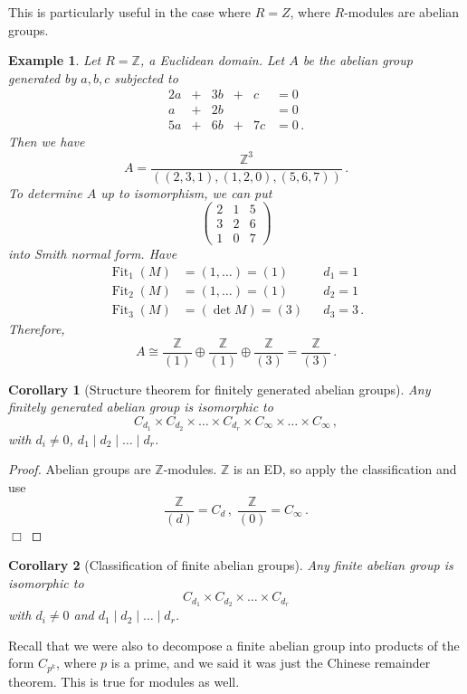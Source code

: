 \documentclass{article}
\theoremstyle{plain}\theoremheaderfont{\normalfont\itshape}\theorembodyfont{\rmfamily}\theoremseparator{.}\newtheorem*{rem}{Remark}\newtheorem*{ex}{Example}\newtheorem*{proof}{Proof}\newtheorem*{altp}{Alternative proof}\newtheorem*{nonex}{Non-Example}
\theoremstyle{plain}\theoremheaderfont{\normalfont\bfseries}\theorembodyfont{\rmfamily}\theoremseparator{.}\newtheorem{thm}{Theorem}[section]\newtheorem{lem}[thm]{Lemma}\newtheorem{prop}[thm]{Proposition}\newtheorem*{cor}{Corollary}\newtheorem{defn}[thm]{Definition}\newtheorem{clm}[thm]{Claim}\newtheorem{clminproof}{Claim}\newtheorem*{notn}{Notation}\newtheorem*{exer}{Exercise}\newtheorem*{lemnn}{Lemma}
\theoremstyle{break}\theoremheaderfont{\normalfont\itshape}\theorembodyfont{\rmfamily}\theoremseparator{.\medskip}\newtheorem*{proofskip}{Proof}\newtheorem*{exs}{Examples}\newtheorem*{rems}{Remarks}\newtheorem*{obs}{Observations}
\theoremstyle{break}\theoremheaderfont{\normalfont\bfseries}\theorembodyfont{\rmfamily}\theoremseparator{.\medskip}\newtheorem{lemskip}[thm]{Lemma}\newtheorem{defnskip}[thm]{Definition}\newtheorem{propskip}[thm]{Proposition}\newtheorem{thmskip}[thm]{Theorem}
\numberwithin{equation}{section}
\newcommand{\qed}{\hfill\ensuremath{\Box}}
\DeclareMathOperator{\Fit}{Fit}
\newcommand{\ZZ}{\mathbb{Z}}
\begin{document}
    This is particularly useful in the case where \(R=Z\), where \(R\)-modules are abelian groups.
    \begin{ex}
        Let \(R=\ZZ\), a Euclidean domain. Let \(A\) be the abelian group generated by \(a,b,c\) subjected to
        \[\begin{alignedat}{4}
            2a & {}+{} & 3b & {}+{} & c &= 0\\
            a & {}+{} & 2b & & &= 0\\
            5a & {}+{} & 6b & {}+{} & 7c &= 0\,.
        \end{alignedat}\]
        Then we have
        \[A=\frac{\ZZ^3}{((2,3,1),(1,2,0),(5,6,7))}\,.\]
        To determine \(A\) up to isomorphism, we can put
        \[\begin{pmatrix}
            2 & 1 & 5\\
            3 & 2 & 6\\
            1 & 0 & 7
        \end{pmatrix}\]
        into Smith normal form. Have
        \begin{align*}
            \Fit_1(M)&=(1,\dots)=(1) && d_1=1\\
            \Fit_2(M)&=(1,\dots)=(1) && d_2=1\\
            \Fit_3(M)&=(\det M)=(3) && d_3=3\,.
        \end{align*}
        Therefore,
        \[A\cong\frac{\ZZ}{(1)}\oplus\frac{\ZZ}{(1)}\oplus\frac{\ZZ}{(3)}=\frac{\ZZ}{(3)}\,.\]
    \end{ex}
    \begin{cor}[Structure theorem for finitely generated abelian groups]
        Any finitely generated abelian group is isomorphic to
        \[C_{d_1}\times C_{d_2}\times \dots\times C_{d_r}\times C_\infty\times\dots\times C_{\infty}\,,\]
        with \(d_i\ne 0\), \(d_1\mid d_2\mid \dots\mid d_r\).
    \end{cor}
    \begin{proof}
        Abelian groups are \(\ZZ\)-modules. \(\ZZ\) is an ED, so apply the classification and use
        \[\frac{\ZZ}{(d)}=C_{d}\,,\;\frac{\ZZ}{(0)}=C_{\infty}\,.\]\qed
    \end{proof}
    \begin{cor}[Classification of finite abelian groups]
        Any finite abelian group is isomorphic to
        \[C_{d_1}\times C_{d_2}\times\dots\times C_{d_r}\]
        with \(d_i\ne 0\) and \(d_1\mid d_2\mid \dots\mid d_r\).
    \end{cor}
    Recall that we were also to decompose a finite abelian group into products of the form \(C_{p^k}\), where \(p\) is a prime, and we said it was just the Chinese remainder theorem. This is true for modules as well.
\end{document}
